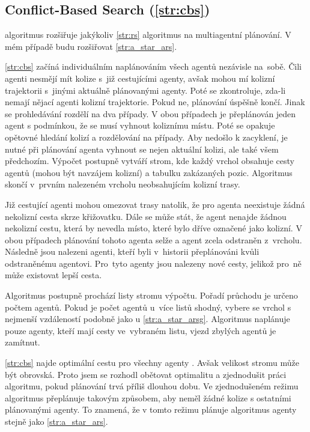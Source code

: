\subsection{Conflict-Based Search (\ref{str:cbs})}\label{subsec:conflict_based_search}


 algoritmus \citep*{Sharon} rozšiřuje jakýkoliv \ref{str:rs} algoritmus
na multiagentní plánování.
V mém případě budu rozšiřovat \ref{str:a_star_ars}.

\ref{str:cbs} začíná individuálním naplánováním všech agentů nezávisle na~sobě.
Čili agenti nesmějí mít kolize s~již cestujícími agenty,
avšak mohou mí kolizní trajektorii s~jinými aktuálně plánovanými agenty.
Poté se zkontroluje, zda-li nemají nějací agenti kolizní trajektorie.
Pokud ne, plánování úspěšně končí.
Jinak se prohledávání rozdělí na dva případy.
V obou případech je přeplánován jeden agent s podmínkou, že se musí vyhnout koliznímu místu.
Poté se opakuje opětovné hledání kolizí a rozdělování na případy.
Aby nedošlo k zacyklení, je nutné při plánování agenta vyhnout se nejen aktuální kolizi, ale také všem předchozím.
Výpočet postupně vytváří strom,
kde každý vrchol obsahuje cesty agentů (mohou být navzájem kolizní) a tabulku zakázaných pozic.
Algoritmus skončí v~prvním nalezeném vrcholu neobsahujícím kolizní trasy.

Již cestující agenti mohou omezovat trasy natolik, že pro agenta neexistuje žádná nekolizní cesta skrze křižovatku.
Dále se může stát, že agent nenajde žádnou nekolizní cestu, která by nevedla místo, které bylo dříve označené jako kolizní.
V obou případech plánování tohoto agenta selže a agent zcela odstraněn z~vrcholu.
Následně jsou nalezeni agenti, kteří byli v~historii přeplánováni kvůli odstraněnému agentovi.
Pro~tyto agenty jsou nalezeny nové cesty, jelikož pro~ně může existovat lepší cesta.

Algoritmus postupně prochází listy stromu výpočtu.
Pořadí průchodu je určeno počtem agentů.
Pokud je počet agentů u~více listů shodný, vybere se vrchol s nejmenší vzdáleností podobně jako u \ref{str:a_star_arsg}.
Algoritmus naplánuje pouze agenty, kteří mají cesty ve~vybraném listu, vjezd zbylých agentů je zamítnut.

\ref{str:cbs} najde optimální cestu pro všechny agenty \citep{Sharon}.
Avšak velikost stromu může být obrovská.
Proto jsem se rozhodl obětovat optimalitu a zjednodušit práci algoritmu, pokud plánování trvá příliš dlouhou dobu.
Ve zjednodušeném režimu algoritmus přeplánuje takovým způsobem, aby neměl žádné kolize s ostatními plánovanými agenty.
To znamená, že v tomto režimu plánuje algoritmus agenty stejně jako \ref{str:a_star_ars}.


